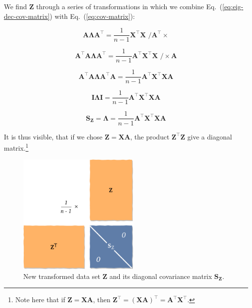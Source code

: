 \documentclass[10pt,twocolumn]{article}
\begin{document}
We find $\mathbf{Z}$ through a series of transformations in which we combine Eq.~(\ref{eq:eig-dec-cov-matrix}) with Eq.~(\ref{eq:cov-matrix}):

\begin{equation}
\mathbf{A} \mathbf{\Lambda} \mathbf{A}^{\top} =  \frac{1}{n-1} \mathbf{X}^{\top} \mathbf{X} \,\, \Big/ \mathbf{A}^{\top} \times
\end{equation}

\begin{equation}
\mathbf{A}^{\top} \mathbf{A} \mathbf{\Lambda} \mathbf{A}^{\top} =  \frac{1}{n-1} \mathbf{A}^{\top}  \mathbf{X}^{\top} \mathbf{X} \,\, \Big/ \times \mathbf{A}
\end{equation}

\begin{equation}
\mathbf{A}^{\top} \mathbf{A} \mathbf{\Lambda} \mathbf{A}^{\top} \mathbf{A} =  \frac{1}{n-1} \mathbf{A}^{\top}  \mathbf{X}^{\top} \mathbf{X} \mathbf{A}
\end{equation}

\begin{equation}
\mathbf{I} \mathbf{\Lambda} \mathbf{I} =  \frac{1}{n-1} \mathbf{A}^{\top}  \mathbf{X}^{\top} \mathbf{X} \mathbf{A}
\end{equation}

\begin{equation}
\mathbf{S_Z}  = \mathbf{\Lambda} = \frac{1}{n-1} \mathbf{A}^{\top}  \mathbf{X}^{\top} \mathbf{X} \mathbf{A}
\end{equation}

It is thus visible, that if we chose $\mathbf{Z} = \mathbf{X} \mathbf{A}$, the product $\mathbf{Z}^{\top} \mathbf{Z}$ give a diagonal matrix.\footnote{Note here that if $\mathbf{Z} = \mathbf{X} \mathbf{A}$, then $\mathbf{Z}^{\top} = (\mathbf{X} \mathbf{A})^{\top} = \mathbf{A}^{\top} \mathbf{X}^{\top}$.}

\begin{figure}[H]
\centering\includegraphics[width=6cm]{PC-scores.pdf}
\caption{New transformed data set $\mathbf{Z}$ and its diagonal covariance matrix $\mathbf{S_Z}$.}
\label{fig:PC-scores}
\end{figure}
\end{document}
